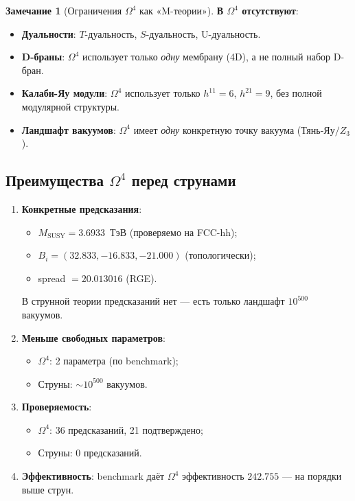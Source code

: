\documentclass[11pt,a4paper]{article}
\newcommand{\Om}{\ensuremath{\Omega^4}}
\theoremstyle{definition}
\newtheorem{remark}[theorem]{Замечание}
\begin{document}
\begin{remark}[Ограничения $\Om$ как «M-теории»]
\label{rem:string-mtheory-limits}
\textbf{В $\Om$ отсутствуют}:
\begin{itemize}
    \item \textbf{Дуальности}: $T$-дуальность, $S$-дуальность,
          U-дуальность.
    \item \textbf{D-браны}: $\Om$ использует только \emph{одну}
          мембрану (4D), а не полный набор D-бран.
    \item \textbf{Калаби-Яу модули}: $\Om$ использует только
          $h^{11} = 6$, $h^{21} = 9$, без полной модулярной структуры.
    \item \textbf{Ландшафт вакуумов}: $\Om$ имеет \emph{одну}
          конкретную точку вакуума (Тянь-Яу$/Z_3$).
\end{itemize}
\end{remark}

\subsection{Преимущества \texorpdfstring{$\Om$}{Omega4} перед струнами}
\label{subsec:string-advantages}

\begin{enumerate}
    \item \textbf{Конкретные предсказания}:
          \begin{itemize}
              \item $M_{\text{SUSY}} = 3.6933$~ТэВ (проверяемо на FCC-hh);
              \item $B_i = (32.833, -16.833, -21.000)$ (топологически);
              \item spread $= 20.013016$ (RGE).
          \end{itemize}
          В струнной теории предсказаний нет ---
          есть только ландшафт $10^{500}$ вакуумов.
    \item \textbf{Меньше свободных параметров}:
          \begin{itemize}
              \item $\Om$: 2 параметра (по benchmark);
              \item Струны: $\sim 10^{500}$ вакуумов.
          \end{itemize}
    \item \textbf{Проверяемость}:
          \begin{itemize}
              \item $\Om$: 36 предсказаний, 21 подтверждено;
              \item Струны: 0 предсказаний.
          \end{itemize}
    \item \textbf{Эффективность}: benchmark даёт $\Om$ эффективность
          $242.755$ --- на порядки выше струн.
\end{enumerate}
\end{document}
